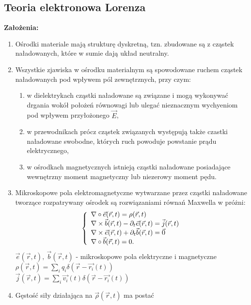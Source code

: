 \subsection{Teoria elektronowa Lorenza}
\textbf{Założenia:}
\begin{enumerate}
	\item Ośrodki materiale mają strukturę dyskretną, tzn. zbudowane są z 
		cząstek naładowanych, które w sumie dają układ neutralny.
	\item Wszystkie zjawiska w ośrodku materialnym są spowodowane ruchem 
		cząstek naładowanych pod wpływem pól zewnętrznych, przy czym:
		\begin{enumerate}
			\item w dielektrykach cząstki naładowane są związane i mogą
				wykonywać drgania wokół położeń równowagi lub ulegać
				nieznacznym wychyeniom pod wpływem przyłożonego $\vec{E}$,
			\item w przewodnikach prócz cząstek związanych występują także
				czastki naładowane swobodne, których ruch powoduje 
				powstanie prądu elektrycznego,
			\item w ośrodkach magnetycznych istnieją cząstki naładowane 
				posiadające wewnętrzny moment magnetyczny lub niezerowy
				moment pędu.
		\end{enumerate}
	\item Mikroskopowe pola elektromagnetyczne wytwarzane przez cząstki 
		naładowane tworzące rozpatrywany ośrodek są rozwiązaniami 
		równań Maxwella w próżni:\\
	\begin{equation}{\label{Max_mikro}}
	\left\{ 
		\begin{array}{l}
		\nabla \circ \vec{e} (\vec{r},t) = \rho(\vec{r},t)\\
		\nabla \times \vec{b}(\vec{r},t) - \partial_t \vec{e}(\vec{r},t) 
			= \vec{j}(\vec{r},t)\\
		\nabla \times \vec{e} (\vec{r},t) + \partial_t \vec{b} (\vec{r},t)
			= \vec{0} \\
		\nabla \circ \vec{b} (\vec{r},t) = 0.
		\end{array}
	\right.
	\end{equation}
	$\vec{e}(\vec{r},t), \ \vec{b}(\vec{r},t)$  - mikroskopowe pola elektryczne i
		magnetyczne \\
	$\rho (\vec{r},t)= \sum_i q_i \delta (\vec{r} -  \vec{r_i} (t))$\\
	$\vec{j}(\vec{r},t)= \sum_i \vec{v_i} (t) \delta(\vec{r} - \vec{r_i}(t))$
	\item Gęstość siły działająca na $\vec{\rho}(\vec{r},t)$ ma postać

\end{enumerate}
